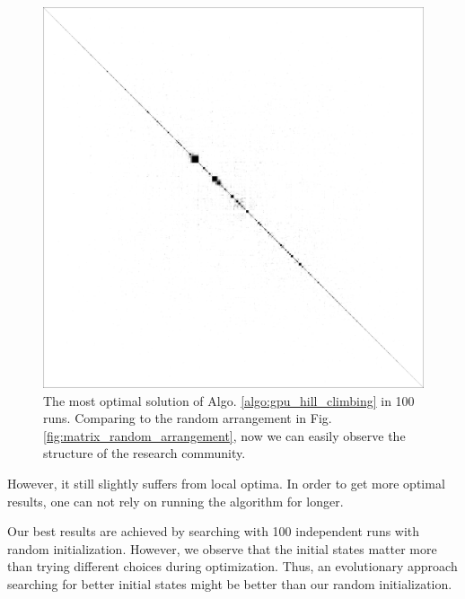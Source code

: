 \begin{figure}
    \centering
    \includegraphics[width=\textwidth]{images/optimized_arrangement.png}
    \caption{The most optimal solution of Algo. \ref{algo:gpu_hill_climbing} in 100 runs.
    Comparing to the random arrangement in Fig. \ref{fig:matrix_random_arrangement}, 
    now we can easily observe the structure of the research community.
    }
    \label{fig:optimization_results}
\end{figure}

However, it still slightly suffers from local optima.
In order to get more optimal results, one can not rely on running the algorithm for longer.

Our best results are achieved by searching with 100 independent runs with random initialization.
However, we observe that the initial states matter more than trying different choices during optimization.
Thus, an evolutionary approach \cite{eppley2001} searching for better initial states might be better than our random initialization.
